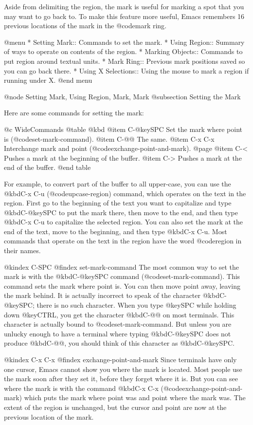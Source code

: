 {{  Aside from delimiting the region, the mark is useful for marking
a spot that you may want to go back to.  To make this feature more useful,
Emacs remembers 16 previous locations of the mark in the @code{mark ring}.

@menu
* Setting Mark::	Commands to set the mark.
* Using Region::	Summary of ways to operate on contents of the region.
* Marking Objects::	Commands to put region around textual units.
* Mark Ring::   	Previous mark positions saved so you can go back there.
* Using X Selections::  Using the mouse to mark a region if running under X.
@end menu

@node Setting Mark, Using Region, Mark, Mark
@subsection Setting the Mark

  Here are some commands for setting the mark:

@c WideCommands
@table @kbd
@item C-@key{SPC}
Set the mark where point is (@code{set-mark-command}).
@item C-@@
The same.
@item C-x C-x
Interchange mark and point (@code{exchange-point-and-mark}).
@page
@item C-<
Pushes a mark at the beginning of the buffer.
@item C->
Pushes a mark at the end of the buffer.
@end table

  For example, to convert part of the buffer to all
upper-case, you can use the @kbd{C-x C-u} (@code{upcase-region})
command, which operates on the text in the region.  First go to the
beginning of the text you want to capitalize and type @kbd{C-@key{SPC}} to
put the mark there, then move to the end, and then type @kbd{C-x C-u} to
capitalize the selected region.  You can also set the mark at the end of the
text, move to the beginning, and then type @kbd{C-x C-u}.  Most commands
that operate on the text in the region have the word @code{region} in
their names.

@kindex C-SPC
@findex set-mark-command
  The most common way to set the mark is with the @kbd{C-@key{SPC}}
command (@code{set-mark-command}).  This command sets the mark where
point is. You can then move point away, leaving the mark behind.  It is
actually incorrect to speak of the character @kbd{C-@key{SPC}}; there is
no such character.  When you type @key{SPC} while holding down
@key{CTRL}, you get the character @kbd{C-@@} on most terminals. This
character is actually bound to @code{set-mark-command}.  But unless you are
unlucky enough to have a terminal where typing @kbd{C-@key{SPC}} does
not produce @kbd{C-@@}, you should think of this character as
@kbd{C-@key{SPC}}.

@kindex C-x C-x
@findex exchange-point-and-mark
  Since terminals have only one cursor, Emacs cannot show you where the
mark is located. Most people use the mark soon after they set it, before
they forget where it is. But you can see where the mark is with the
command @kbd{C-x C-x} (@code{exchange-point-and-mark}) which puts the
mark where point was and point where the mark was.  The extent of the
region is unchanged, but the cursor and point are now at the previous
location of the mark. 

}}
